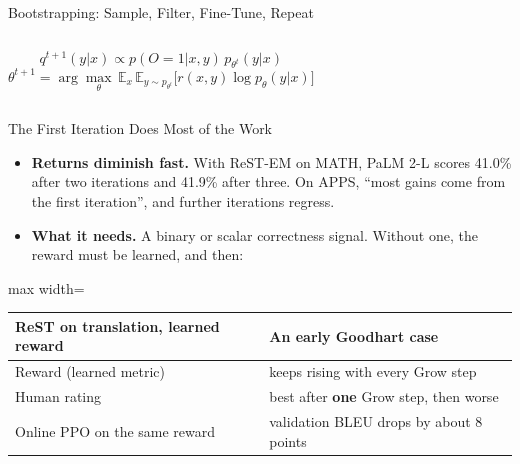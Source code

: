 \begin{frame}{Bootstrapping: Sample, Filter, Fine-Tune, Repeat}
\begin{columns}[T,onlytextwidth]
        \[
            q^{t+1}(y|x)\propto p(O{=}1|x,y)\,p_{\theta^t}(y|x)
        \]
        \[
            \theta^{t+1}=\arg\max_\theta\,\mathbb{E}_{x}\,\mathbb{E}_{y\sim p_{\theta^t}}\big[r(x,y)\log p_\theta(y|x)\big]
        \]
    \end{columns}
    \vspace{0.2em}
\end{frame}

\begin{frame}{The First Iteration Does Most of the Work}
    \begin{itemize}\itemsep0.5em
        \item \textbf{Returns diminish fast.} With ReST-EM on MATH, PaLM 2-L scores 41.0\% after two iterations and 41.9\% after three. On APPS, ``most gains come from the first iteration'', and further iterations \alert{regress}.
        \item \textbf{What it needs.} A binary or scalar correctness signal. Without one, the reward must be learned, and then:
    \end{itemize}
    \vspace{0.3em}
    \begin{center}
    \small
    \begin{adjustbox}{max width=\linewidth}\begin{tabular}{>{\raggedright\arraybackslash}p{4.4cm}>{\raggedright\arraybackslash}p{8.6cm}}
        \toprule
        \textbf{ReST on translation, learned reward} & \textbf{An early Goodhart case} \\
        \midrule
        Reward (learned metric) & keeps rising with every Grow step \\
        Human rating & best after \textbf{one} Grow step, then worse \\
        Online PPO on the same reward & validation BLEU drops by about 8 points \\
        \bottomrule
    \end{tabular}\end{adjustbox}
    \end{center}
    \vspace{0.3em}
\end{frame}

